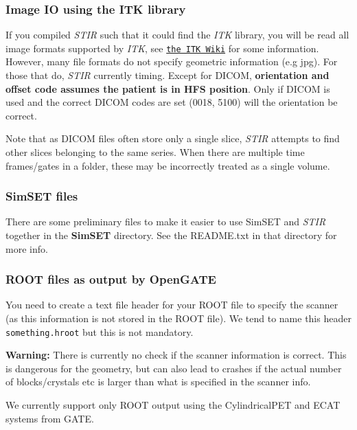 \documentclass{article}
\def\url#1#2{\mbox{\href{#1}{\tt #2}}}
\begin{document}
\subsubsection{Image IO using the ITK library \label{sec:ITKIO}}
If you compiled \textit{STIR} such that it could find the \textit{ITK} library, you will be read
all image formats supported by \textit{ITK}, see \url{http://www.itk.org/Wiki/ITK/File_Formats}{the ITK Wiki}
for some information. However, many file formats do not specify geometric information (e.g jpg). For those
that do, \textit{STIR} currently timing. Except for DICOM, \textbf{orientation and offset code
assumes the patient is in HFS position}. Only if DICOM is used and the correct DICOM codes are set
(0018, 5100) will the orientation be correct.

Note that as DICOM files often store only a single slice, \textit{STIR} attempts to find
other slices belonging to the same series. When there are multiple time frames/gates in a folder, 
these may be incorrectly treated as a single volume.

\subsubsection{SimSET files}
There are some preliminary files to make it easier to use SimSET and \textit{STIR} together in the
\textbf{SimSET} directory. See the README.txt in that directory for more info.

\subsubsection{ROOT files as output by OpenGATE}
You need to create a text file header for your ROOT file
to specify the scanner (as this information is not stored in the ROOT file).
We tend to name this header \texttt{something.hroot} but this is not mandatory.

\textbf{Warning:} There is currently no check if the scanner information is correct. This
  is dangerous for the geometry, but can also lead to crashes if the actual number of 
  blocks/crystals etc is larger than what is specified in the scanner info.

We currently support only ROOT output using the CylindricalPET and ECAT systems
from GATE.
\end{document}
